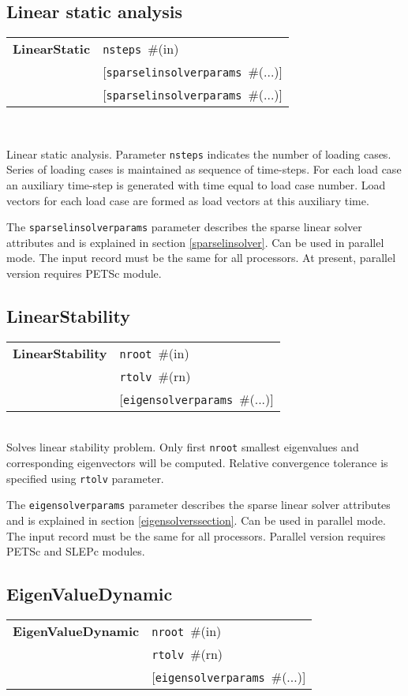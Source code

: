 \documentclass[a4paper]{article}
\newcommand{\param}[1]{\texttt{#1}} %
\newcommand{\optional}[1]{[#1]} %
\newcommand{\field}[2]{\param{#1}~\#{\tiny(#2)}} %
\newcommand{\optField}[2]{\optional{\field{#1}{#2}}}
\newcommand{\entKeywordInst}[1]{\textbf{#1}} %
\newcommand{\Pmode}[1]{{\sffamily #1}}
\newenvironment{record}[1][]{\begin{tabular}{|ll}}{\end{tabular}\\}
\newcommand{\recentry}[2]{{#1}&{#2}\\}
\newcounter{rcc}
\newenvironment{record}[1][\textwidth]{\setcounter{rcc}{0}\rowcolors{1}{lightgray}{lightgray}\tabularx{#1}{llR} \hline}
               {\endtabularx}
\newcommand{\recentry}[2]{\ifthenelse{\value{rcc}>0}{$\backslash$ \\}{\setcounter{rcc}{1}}{#1}&{#2}&}
\begin{document}
\subsection{Linear static analysis}
\label{LinearStatic}
\begin{record}
  \recentry{\entKeywordInst{LinearStatic}}{\field{nsteps}{in}}
  \recentry{}{\optField{sparselinsolverparams}{...}}
  \recentry{}{\optField{sparselinsolverparams}{...}}
\end{record}

Linear static analysis.
Parameter \param{nsteps} indicates the number of loading cases.
Series of loading cases is maintained as sequence of time-steps.
For each load case an auxiliary time-step is generated with time
equal to load case number.
Load vectors for each load case are formed as load vectors at
this auxiliary time.

The  \param{sparselinsolverparams} parameter describes the sparse
linear solver attributes and is explained in section \ref{sparselinsolver}.
\Pmode{Can be used in parallel mode. The input record must be the same
for all processors. At present, parallel version requires PETSc module.}


\subsection{LinearStability}
\label{LinearStability}
\begin{record}
  \recentry{\entKeywordInst{LinearStability}}{\field{nroot}{in}}
  \recentry{}{\field{rtolv}{rn}}
  \recentry{}{\optField{eigensolverparams}{...}}
\end{record}
Solves linear stability problem. Only first \param{nroot} smallest
eigenvalues and corresponding eigenvectors will be computed.
Relative convergence tolerance is specified using \param{rtolv} parameter.

The \param{eigensolverparams} parameter describes the sparse
linear solver attributes and is explained in section \ref{eigensolverssection}.
\Pmode{Can be used in parallel mode. The input record must be the same
for all processors. Parallel version requires PETSc and SLEPc modules.}

\subsection{EigenValueDynamic}
\label{EigenValueDynamic}
\begin{record}
  \recentry{\entKeywordInst{EigenValueDynamic}}{\field{nroot}{in}}
  \recentry{}{\field{rtolv}{rn}}
  \recentry{}{\optField{eigensolverparams}{...}}
\end{record}
\end{document}
